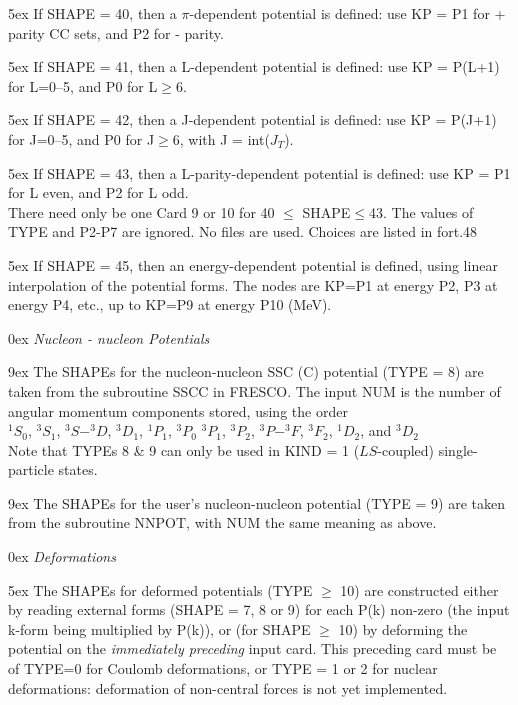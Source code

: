 \documentclass[11pt]{article}
\begin{document}
\hangindent 5ex
If SHAPE = 40, then a $\pi$-dependent potential is defined:
use KP = P1 for + parity CC sets, and P2 for - parity.

\hangindent 5ex
If SHAPE = 41, then a L-dependent potential is defined:
use KP = P(L+1) for L=0--5, and P0 for L$\geq$6.

\hangindent 5ex
If SHAPE = 42, then a J-dependent potential is defined:
use KP = P(J+1) for J=0--5, and P0 for J$\geq$6, with J = int($J_T$).

\hangindent 5ex
If SHAPE = 43, then a L-parity-dependent potential is defined:
use KP = P1 for L even, and P2 for L odd.
\\
There need only be one Card 9 or 10 for 40 $\leq$ SHAPE$\leq$43. The values of TYPE
and P2-P7 are ignored. No files are used. Choices are listed in fort.48

\hangindent 5ex
If SHAPE = 45, then an energy-dependent potential is defined, using linear interpolation of the potential forms.
The nodes are KP=P1 at energy P2, P3 at energy P4, etc., up to KP=P9 at energy P10 (MeV).


\hangindent 0ex
\bigskip
{\em Nucleon - nucleon Potentials}
\bigskip

\hangindent 9ex
The SHAPEs for the nucleon-nucleon SSC (C) potential (TYPE = 8) are
taken from the subroutine SSCC in FRESCO.
The input NUM is the number of angular momentum components stored,
using the order
\\
 $^1S_{0}$, $^3S_{1}$, $^3S-^3D$, $^3D_{1}$, $^1P_{1}$, $^3P_{0}$
$^3P_{1}$, $^3P_2$, $^3P-^3F$, $^3F_2$, $^1D_2$, and $^3D_2$
\\
Note that TYPEs 8 \& 9 can only be used in KIND = 1 ($LS$-coupled)
single-particle states.
\bigskip

\hangindent 9ex
The SHAPEs for the user's nucleon-nucleon potential (TYPE = 9) are
taken from the subroutine NNPOT, with NUM the same meaning as above.

\hangindent 0ex
\bigskip
{\em Deformations}
\bigskip

\hangindent 5ex
The SHAPEs for deformed potentials (TYPE $\geq$ 10) are constructed either
by reading external forms (SHAPE = 7, 8 or 9) for each P(k) non-zero
(the input k-form being multiplied by P(k)),
or (for SHAPE $\geq$ 10) by deforming the potential on the
{\em immediately preceding} input card.
This preceding card must be of TYPE=0 for Coulomb deformations,
or TYPE = 1 or 2 for nuclear deformations: deformation of non-central
forces is not yet implemented.
\bigskip
\end{document}
